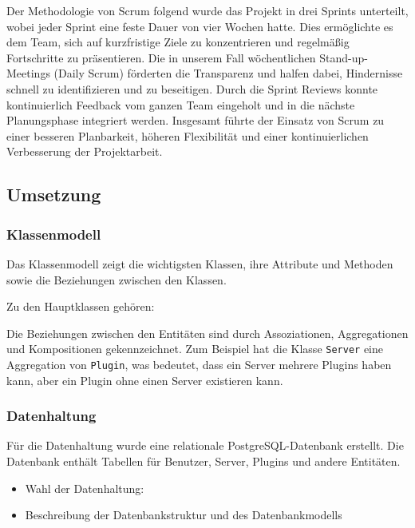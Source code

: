 Der Methodologie von Scrum folgend wurde das Projekt in drei Sprints unterteilt, wobei jeder Sprint eine feste Dauer von vier Wochen hatte. Dies ermöglichte es dem Team, sich auf kurzfristige Ziele zu konzentrieren und regelmäßig Fortschritte zu präsentieren. Die in unserem Fall wöchentlichen Stand-up-Meetings (Daily Scrum) förderten die Transparenz und halfen dabei, Hindernisse schnell zu identifizieren und zu beseitigen. Durch die Sprint Reviews konnte kontinuierlich Feedback vom ganzen Team eingeholt und in die nächste Planungsphase integriert werden. Insgesamt führte der Einsatz von Scrum zu einer besseren Planbarkeit, höheren Flexibilität und einer kontinuierlichen Verbesserung der Projektarbeit.

\subsection{Umsetzung}\label{umsetzung}

\subsubsection{Klassenmodell}\label{klassenmodell}

Das Klassenmodell zeigt die wichtigsten Klassen, ihre
Attribute und Methoden sowie die Beziehungen zwischen den Klassen.

Zu den Hauptklassen gehören:





Die Beziehungen zwischen den Entitäten sind durch Assoziationen,
Aggregationen und Kompositionen gekennzeichnet. Zum Beispiel hat die
Klasse \texttt{Server} eine Aggregation von \texttt{Plugin}, was
bedeutet, dass ein Server mehrere Plugins haben kann, aber ein Plugin
ohne einen Server existieren kann.

\subsubsection{Datenhaltung}\label{datenhaltung}

Für die Datenhaltung wurde eine relationale Post\-greSQL-Datenbank erstellt. Die Datenbank enthält Tabellen für Benutzer, Server, Plugins und andere Entitäten.

\begin{itemize}
  \item
        Wahl der Datenhaltung:
  \item
        Beschreibung der Datenbankstruktur und des Datenbankmodells
\end{itemize}

